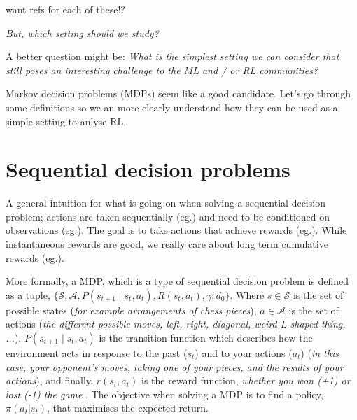 {\color{red} want refs for each of these!?}

\begin{displayquote}
  \textit{But, which setting should we study?}
\end{displayquote}

\begin{displayquote}
  A better question might be: \textit{What is the simplest setting we can
  consider that still poses an interesting challenge to the ML and / or RL communities?}
\end{displayquote}

Markov decision problems (MDPs) seem like a good candidate. Let's go through some definitions so we an more clearly understand how they can be used as a
simple setting to anlyse RL.

\section{Sequential decision problems}

A general intuition for what is going on when solving a sequential decision problem; actions are taken
sequentially (eg.) and need to be conditioned on observations (eg.).
The goal is to take actions that achieve rewards (eg.). While instantaneous
rewards are good, we really care about long term cumulative rewards (eg.).


More formally, a MDP, which is a type of sequential decision problem is defined
as a tuple, \(\{\mathcal S, \mathcal A, P(s_{t+1} \mid s_t, a_t),R(s_t, a_t), \gamma, d_0\}\).
Where \(s \in \mathcal S\) is the set of possible states (\textit{for example arrangements of chess pieces}),
\(a \in \mathcal A\) is the set of actions (\textit{the different possible moves, left,
right, diagonal, weird L-shaped thing, ...}),  \(P(s_{t+1} \mid s_t, a_t)\)
is the transition function which describes how the environment acts in response
to the past (\(s_t\)) and to your actions (\(a_t\)) (\textit{in this case, your
opponent's moves, taking one of your pieces, and the results of your actions}),
and finally, \(r(s_t, a_t)\) is the reward function, \textit{whether you won (+1) or lost (-1) the game }.
The objective when solving a MDP is to find a policy, $\pi(a_t | s_t)$,
that maximises the expected return.

